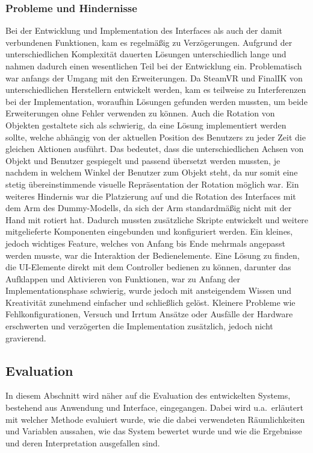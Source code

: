 \subsubsection{Probleme und Hindernisse}
Bei der Entwicklung und Implementation des Interfaces als auch der damit verbundenen Funktionen, kam es regelmäßig zu Verzögerungen.  Aufgrund der unterschiedlichen Komplexität dauerten Lösungen unterschiedlich lange und nahmen dadurch einen wesentlichen Teil bei der Entwicklung ein. Problematisch war anfangs der Umgang mit den Erweiterungen. Da SteamVR und FinalIK von unterschiedlichen Herstellern entwickelt werden, kam es teilweise zu Interferenzen bei der Implementation, woraufhin Lösungen gefunden werden mussten, um beide Erweiterungen ohne Fehler verwenden zu können. Auch die Rotation von Objekten gestaltete sich als schwierig, da eine Lösung implementiert werden sollte, welche abhängig von der aktuellen Position des Benutzers zu jeder Zeit die gleichen Aktionen ausführt. Das bedeutet, dass die unterschiedlichen Achsen von Objekt und Benutzer gespiegelt und passend übersetzt werden mussten, je nachdem in welchem Winkel der Benutzer zum Objekt steht, da nur somit eine stetig übereinstimmende visuelle Repräsentation der Rotation möglich war. Ein weiteres Hindernis war die Platzierung auf und die Rotation des Interfaces mit dem Arm des Dummy-Modells, da sich der Arm standardmäßig nicht mit der Hand mit rotiert hat. Dadurch mussten zusätzliche Skripte entwickelt und weitere mitgelieferte Komponenten eingebunden und konfiguriert werden. Ein kleines, jedoch wichtiges Feature, welches von Anfang bis Ende mehrmals angepasst werden musste, war die Interaktion der Bedienelemente. Eine Lösung zu finden, die UI-Elemente direkt mit dem Controller bedienen zu können, darunter das Aufklappen und Aktivieren von Funktionen, war zu Anfang der Implementationsphase schwierig, wurde jedoch mit ansteigendem Wissen und Kreativität zunehmend einfacher und schließlich gelöst. Kleinere Probleme wie Fehlkonfigurationen, Versuch und Irrtum Ansätze oder Ausfälle der Hardware erschwerten und verzögerten die Implementation zusätzlich, jedoch nicht gravierend.

\subsection{Evaluation}
In diesem Abschnitt wird näher auf die Evaluation des entwickelten Systems, bestehend aus Anwendung und Interface, eingegangen. Dabei wird u.a.~erläutert mit welcher Methode evaluiert wurde, wie die dabei verwendeten Räumlichkeiten und Variablen aussahen, wie das System bewertet wurde und wie die Ergebnisse und deren Interpretation ausgefallen sind.

